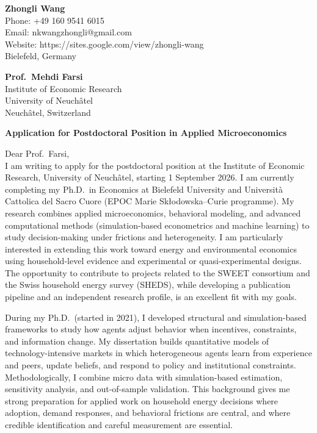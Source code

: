 \documentclass[11pt]{article}
\begin{document}
\noindent
\textbf{Zhongli Wang} \\
Phone: +49 160 9541 6015 \\
Email: nkwangzhongli@gmail.com \\
Website: https://sites.google.com/view/zhongli-wang \\
Bielefeld, Germany \\

\vspace{0.5cm}

\noindent
\textbf{Prof.\ Mehdi Farsi} \\
Institute of Economic Research \\
University of Neuch\^{a}tel \\
Neuch\^{a}tel, Switzerland \\

\vspace{0.5cm}

\noindent
\textbf{Application for Postdoctoral Position in Applied Microeconomics} \\

\vspace{0.3cm}

\noindent Dear Prof.\ Farsi,\\[0.2cm]

I am writing to apply for the postdoctoral position at the Institute of Economic Research, University of Neuch\^{a}tel, starting 1 September 2026. 
I am currently completing my Ph.D.\ in Economics at Bielefeld University and Universit\`a Cattolica del Sacro Cuore (EPOC Marie Sk{\l}odowska--Curie programme). 
My research combines applied microeconomics, behavioral modeling, and advanced computational methods (simulation-based econometrics and machine learning) to study decision-making under frictions and heterogeneity. 
I am particularly interested in extending this work toward energy and environmental economics using household-level evidence and experimental or quasi-experimental designs. 
The opportunity to contribute to projects related to the SWEET consortium and the Swiss household energy survey (SHEDS), while developing a publication pipeline and an independent research profile, is an excellent fit with my goals.

During my Ph.D.\ (started in 2021), I developed structural and simulation-based frameworks to study how agents adjust behavior when incentives, constraints, and information change. 
My dissertation builds quantitative models of technology-intensive markets in which heterogeneous agents learn from experience and peers, update beliefs, and respond to policy and institutional constraints. 
Methodologically, I combine micro data with simulation-based estimation, sensitivity analysis, and out-of-sample validation. 
This background gives me strong preparation for applied work on household energy decisions where adoption, demand responses, and behavioral frictions are central, and where credible identification and careful measurement are essential.
\end{document}
